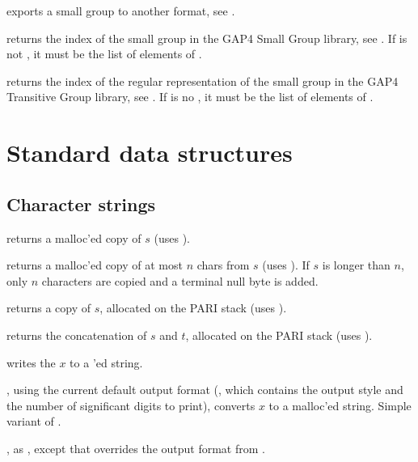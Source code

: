  exports a small group
to another format, see .

 returns the index of the small group
 in the GAP4 Small Group library, see . If
 is not , it must be the list of elements of .

 returns the index of the
regular representation of the small group  in the GAP4 Transitive
Group library, see . If  is no , it must be
the list of elements of .

\newpage
\chapter{Standard data structures}

\section{Character strings}


 returns a malloc'ed copy of $s$
(uses ).

 returns a malloc'ed copy of
at most $n$ chars from $s$ (uses ). If $s$ is longer than
$n$, only $n$ characters are copied and a terminal null byte is added.

 returns a copy of $s$, allocated
on the PARI stack (uses ).

 returns the
concatenation of $s$ and $t$, allocated on the PARI stack (uses
).

 writes the  $x$ to a 'ed
string.

, using the current default output format
(, which contains the output style and the number of
significant digits to print), converts $x$ to a malloc'ed string. Simple
variant of .

, as , except that
 overrides the output format from .

